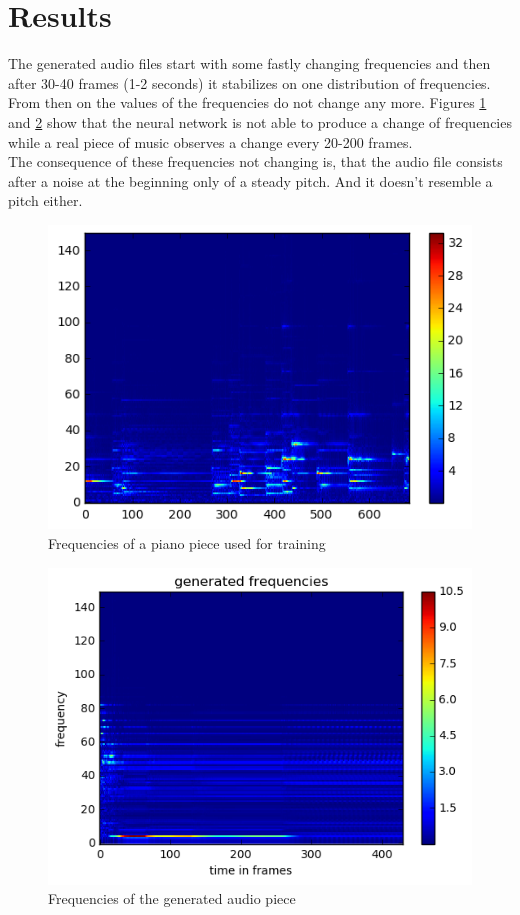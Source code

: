 \documentclass[10pt,conference,compsocconf]{IEEEtran}
\begin{document}
\section{Results}
The generated audio files start with some fastly changing frequencies and then after 30-40 frames (1-2 seconds) it stabilizes on one distribution of frequencies. From then on the values of the frequencies do not change any more. Figures \ref{fig:original_frequencies} and \ref{fig:generated_frequencies} show that the neural network is not able to produce a change of frequencies while a real piece of music observes a change every 20-200 frames.\\
The consequence of these frequencies not changing is, that the audio file consists after a noise at the beginning only of a steady pitch. And it doesn't resemble a pitch either.\\

\begin{figure}[tbp]
  \centering
  \includegraphics[width=\columnwidth]{figures/original_frequencies.png}
  \caption{Frequencies of a piano piece used for training}
  \label{fig:original_frequencies}
\end{figure}
\begin{figure}[tbp]
  \centering
  \includegraphics[width=\columnwidth]{figures/generated_frequencies_20s.png}
  \caption{Frequencies of the generated audio piece}
  \label{fig:generated_frequencies}
\end{figure}
\end{document}
